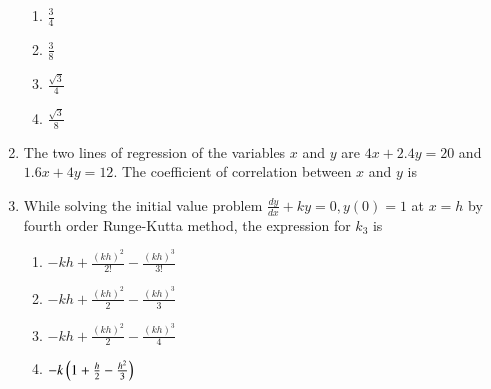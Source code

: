 \documentclass[journal]{IEEEtran}
\begin{document}
\begin{enumerate}
		\begin{enumerate}
			\item $\frac{3}{4}$
			\item $\frac{3}{8}$
	         	\item $\frac{\sqrt{3}}{4}$
                 	\item $\frac{\sqrt{3}}{8}$
	\end{enumerate}	
    \item The two lines of regression of the variables $x$ and $y$ are $4 x+2.4 y=20$ and $1.6 x+4 y=12$.
The coefficient of correlation between $x$ and $y$ is
      \begin{enumerate}
	       \end{enumerate}
        \item  While solving the initial value problem
$\frac{d y}{d x}+k y=0, y(0)=1$ at $x=h$ by fourth order Runge-Kutta method, the expression for $k_{3}$ is
            \begin{enumerate}
			\item $-k h+\frac{(k h)^{2}}{2!}-\frac{(k h)^{3}}{3!}$
			\item $-k h+\frac{(k h)^{2}}{2}-\frac{(k h)^{3}}{3}$
			\item $-k h+\frac{(k h)^{2}}{2}-\frac{(k h)^{3}}{4}$
			\item $-k\left(1+\frac{h}{2}-\frac{h^{2}}{3}\right)$
        	\end{enumerate}	
\end{enumerate}		
\end{document}
